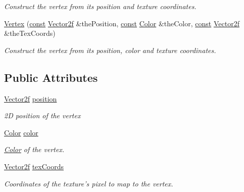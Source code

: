 \begin{DoxyCompactItemize}
\begin{DoxyCompactList}\small\item\em Construct the vertex from its position and texture coordinates. \end{DoxyCompactList}\item 
\hyperlink{classsf_1_1_vertex_ad5943f2b3cbc64b6e714bb37ccaf4960}{Vertex} (\hyperlink{term__entry_8h_a57bd63ce7f9a353488880e3de6692d5a}{const} \hyperlink{namespacesf_a80cea3c46537294fd1d8d428566ad8b2}{Vector2f} \&the\-Position, \hyperlink{term__entry_8h_a57bd63ce7f9a353488880e3de6692d5a}{const} \hyperlink{classsf_1_1_color}{Color} \&the\-Color, \hyperlink{term__entry_8h_a57bd63ce7f9a353488880e3de6692d5a}{const} \hyperlink{namespacesf_a80cea3c46537294fd1d8d428566ad8b2}{Vector2f} \&the\-Tex\-Coords)
\begin{DoxyCompactList}\small\item\em Construct the vertex from its position, color and texture coordinates. \end{DoxyCompactList}\end{DoxyCompactItemize}
\subsection*{Public Attributes}
\begin{DoxyCompactItemize}
\item 
\hyperlink{namespacesf_a80cea3c46537294fd1d8d428566ad8b2}{Vector2f} \hyperlink{classsf_1_1_vertex_a8a4e0f4dfa7f1eb215c92e93d04f0ac0}{position}
\begin{DoxyCompactList}\small\item\em 2\-D position of the vertex \end{DoxyCompactList}\item 
\hyperlink{classsf_1_1_color}{Color} \hyperlink{classsf_1_1_vertex_a799faa0629442e90f07cd2edb568ff80}{color}
\begin{DoxyCompactList}\small\item\em \hyperlink{classsf_1_1_color}{Color} of the vertex. \end{DoxyCompactList}\item 
\hyperlink{namespacesf_a80cea3c46537294fd1d8d428566ad8b2}{Vector2f} \hyperlink{classsf_1_1_vertex_a9e79bd05818d36c4789751908037097c}{tex\-Coords}
\begin{DoxyCompactList}\small\item\em Coordinates of the texture's pixel to map to the vertex. \end{DoxyCompactList}\end{DoxyCompactItemize}


